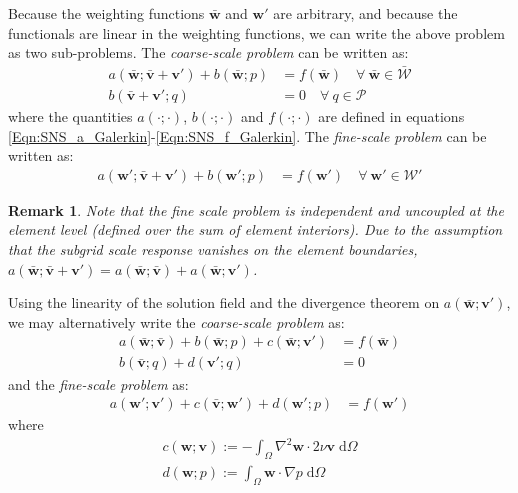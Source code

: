 \documentclass[11pt]{amsart}
\newtheorem{remark}[theorem]{Remark}
\begin{document}
Because the weighting functions $\bar{\boldsymbol{w}}$ and $\boldsymbol{w}'$ 
are arbitrary, and because the functionals are linear in the weighting functions, we can write 
the above problem as two sub-problems. The \emph{coarse-scale problem} can be written as:
\begin{align}
  \label{Eqn:SNS_CoarseScale_Momentum}
  a(\bar{\boldsymbol{w}};\bar{\boldsymbol{v}} + \boldsymbol{v}') + 
  b(\bar{\boldsymbol{w}};p) 
  &= f(\bar{\boldsymbol{w}}) \quad \forall \ \bar{\boldsymbol{w}} \in \bar{\mathcal{W}} \\
\label{Eqn:SNS_CoarseScale_Continuity}
  b(\bar{\boldsymbol{v}} + \boldsymbol{v}';q) &= 0 \quad \forall \ q \in \mathcal{P}
\end{align}
where the quantities $a(\cdot;\cdot)$, $b(\cdot;\cdot)$ and $f(\cdot;\cdot)$ 
are defined in equations \eqref{Eqn:SNS_a_Galerkin}-\eqref{Eqn:SNS_f_Galerkin}. The 
\emph{fine-scale problem} can be written as:
\begin{align}
  \label{Eqn:SNS_FineScale_Momentum}
  a(\boldsymbol{w}';\bar{\boldsymbol{v}} + \boldsymbol{v}') + 
  b(\boldsymbol{w}';p) 
  &= f(\boldsymbol{w}') \quad \forall \ \boldsymbol{w}' \in \mathcal{W}' 
\end{align}
\begin{remark}
Note that the fine scale problem is independent and uncoupled at the element level (defined over the sum of element interiors).  Due to the assumption that the subgrid scale response vanishes on the element boundaries, $a(\bar{\boldsymbol{w}};\bar{\boldsymbol{v}} + \boldsymbol{v}') = a(\bar{\boldsymbol{w}};\bar{\boldsymbol{v}}) + a(\bar{\boldsymbol{w}};\boldsymbol{v}')$.
\end{remark}
Using the linearity of the solution field and the divergence theorem on $a(\bar{\boldsymbol{w}};\boldsymbol{v}')$, we may alternatively write the \emph{coarse-scale problem} as:
\begin{align}
  \label{Eqn:SNS_CoarseScale_Momentum_Alt}
a(\bar{\boldsymbol{w}};\bar{\boldsymbol{v}}) + 
  b(\bar{\boldsymbol{w}};p) + 
  c(\bar{\boldsymbol{w}};\boldsymbol{v}') 
  &= f(\bar{\boldsymbol{w}}) \\
  \label{Eqn:SNS_CoarseScale_Continuity_Alt} 
  b(\bar{\boldsymbol{v}};q) +
  d(\boldsymbol{v}';q) &= 0
\end{align}
and the \emph{fine-scale problem} as: 
\begin{align}
  \label{Eqn:SNS_FineScale_Momentum_Alt}
a(\boldsymbol{w}';\boldsymbol{v}') + 
  c(\bar{\boldsymbol{v}};\boldsymbol{w}') +
  d(\boldsymbol{w}';p)  &= f(\boldsymbol{w}')
\end{align}
where 
\begin{align}
\label{Eqn:SNS_New_Bilinear_Forms}
c(\boldsymbol{w};\boldsymbol{v}) := -\int_{\Omega} \nabla^2 \boldsymbol{w} \cdot 2\nu \boldsymbol{v} \; \mathrm{d} \Omega \\
d(\boldsymbol{w};p) :=  \int_{\Omega} \boldsymbol{w} \cdot \nabla p \; \mathrm{d} \Omega
\end{align}
\end{document}
